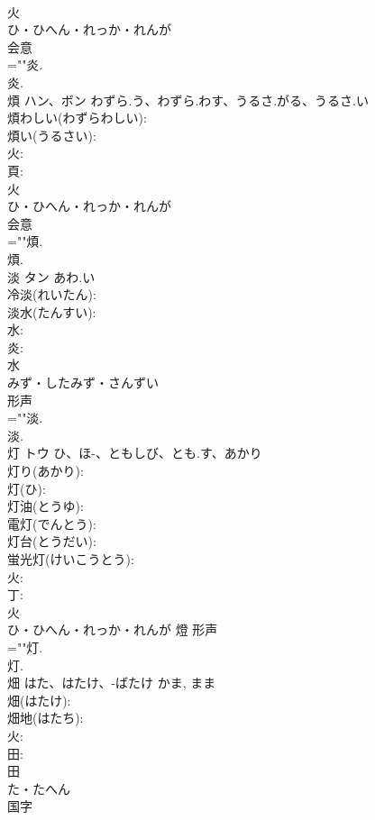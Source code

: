 \documentclass[8pt]{extreport}
\begin{document}
\begin{CJK}{UTF8}{min}
\\	火	
\\	ひ・ひへん・れっか・れんが	
\\	会意 
\\	=""炎.
\\	炎.
\\	煩	ハン、ボン	わずら.う、わずら.わす、うるさ.がる、うるさ.い		
\\	煩わしい(わずらわしい): 
\\	煩い(うるさい): 
\\	火: 
\\	頁: 
\\	火	
\\	ひ・ひへん・れっか・れんが	
\\	会意 
\\	=""煩.
\\	煩.
\\	淡	タン	あわ.い		
\\	冷淡(れいたん): 
\\	淡水(たんすい): 
\\	水: 
\\	炎: 
\\	水	
\\	みず・したみず・さんずい	
\\	形声 
\\	=""淡.
\\	淡.
\\	灯	トウ	ひ、ほ-、ともしび、とも.す、あかり		
\\	灯り(あかり): 
\\	灯(ひ): 
\\	灯油(とうゆ): 
\\	電灯(でんとう): 
\\	灯台(とうだい): 
\\	蛍光灯(けいこうとう): 
\\	火: 
\\	丁: 
\\	火	
\\	ひ・ひへん・れっか・れんが	燈	形声 
\\	=""灯.
\\	灯.
\\	畑		はた、はたけ、-ばたけ	かま, まま	
\\	畑(はたけ): 
\\	畑地(はたち): 
\\	火: 
\\	田: 
\\	田	
\\	た・たへん	
\\	国字 

\end{CJK}
\end{document}
